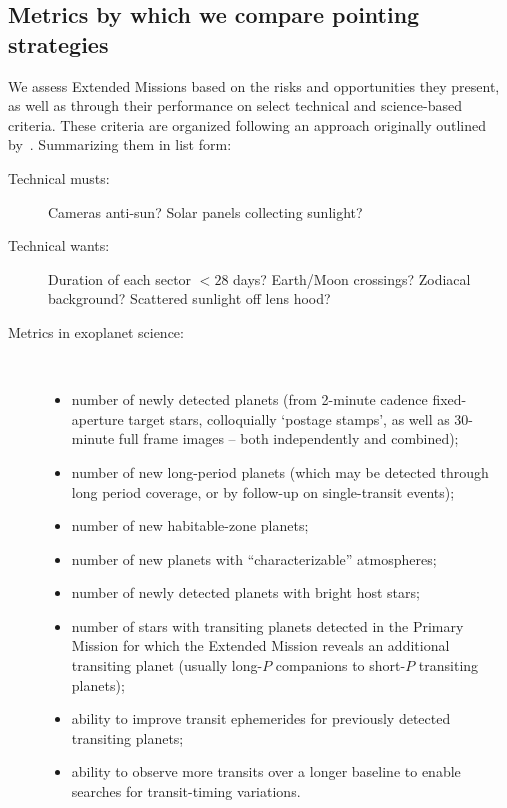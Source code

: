 \subsection{Metrics by which we compare pointing strategies}
\label{sec:comparing_pointing_strategies}

We assess Extended Missions based on the risks and opportunities they
present, as well as through their performance on select technical and
science-based criteria.  These criteria are organized following an
approach originally outlined by~\citet{kepner_rational_1965}.
Summarizing them in list form:
\begin{description}
\item[Technical musts:] Cameras anti-sun? Solar panels collecting sunlight?
\item[Technical wants:] Duration of each sector $<28$ days? Earth/Moon crossings? Zodiacal background? Scattered sunlight off lens hood?
\item[Metrics in exoplanet science:]\
	\begin{itemize}
	\item number of newly detected planets (from 2-minute cadence fixed-aperture target stars, colloquially `postage stamps', as well as 30-minute full frame images -- both independently and combined); 
	\item number of new long-period planets (which may be detected through long period coverage, or by follow-up on single-transit events); 
	\item number of new habitable-zone planets; 
	\item number of new planets with ``characterizable'' atmospheres; 
	\item number of newly detected planets with bright host stars; 
	\item number of stars with transiting planets detected in the Primary Mission for which the Extended Mission reveals an additional
          transiting planet (usually long-$P$ companions to short-$P$ transiting planets);
        \item ability to improve transit ephemerides for previously detected transiting planets;
	\item ability to observe more transits over a longer baseline to enable searches for transit-timing variations.
        \end{itemize}
\end{description}

